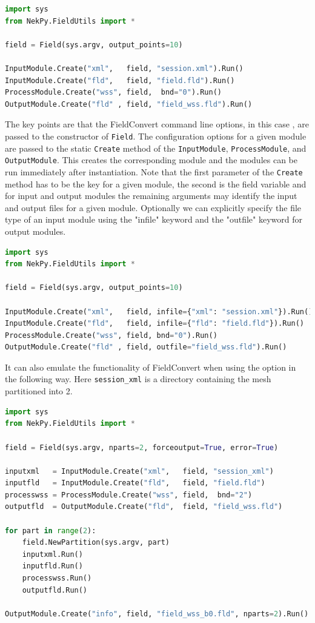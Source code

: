 \begin{lstlisting}[style=C++Style, language=Python]
import sys
from NekPy.FieldUtils import *

field = Field(sys.argv, output_points=10)

InputModule.Create("xml",   field, "session.xml").Run()
InputModule.Create("fld",   field, "field.fld").Run()
ProcessModule.Create("wss", field,  bnd="0").Run()
OutputModule.Create("fld" , field, "field_wss.fld").Run()
\end{lstlisting}

The key points are that the FieldConvert command line options, in this
case , are passed to the constructor of \verb+Field+.
The configuration options for a given module are passed to the static
\verb+Create+ method of the \verb+InputModule+, \verb+ProcessModule+, and
\verb+OutputModule+. This creates the corresponding module and the
modules can be run immediately after instantiation. Note that the first
parameter of the \verb+Create+ method has to be the key for a given module,
the second is the field variable and for input and output modules the remaining
arguments may identify the input and output files for a given module.
Optionally we can explicitly specify the file type of an input module
using the "infile" keyword and the "outfile" keyword for output modules.


\begin{lstlisting}[style=C++Style, language=Python]
import sys
from NekPy.FieldUtils import *

field = Field(sys.argv, output_points=10)

InputModule.Create("xml",   field, infile={"xml": "session.xml"}).Run()
InputModule.Create("fld",   field, infile={"fld": "field.fld"}).Run()
ProcessModule.Create("wss", field, bnd="0").Run()
OutputModule.Create("fld" , field, outfile="field_wss.fld").Run()
\end{lstlisting}

It can also emulate the functionality of FieldConvert when using the
 option in the following way. Here \verb+session_xml+ is a
directory containing the mesh partitioned into 2.

\begin{lstlisting}[style=C++Style, language=Python]
import sys
from NekPy.FieldUtils import *

field = Field(sys.argv, nparts=2, forceoutput=True, error=True)

inputxml   = InputModule.Create("xml",   field, "session_xml")
inputfld   = InputModule.Create("fld",   field, "field.fld")
processwss = ProcessModule.Create("wss", field,  bnd="2")
outputfld  = OutputModule.Create("fld",  field, "field_wss.fld")

for part in range(2):
	field.NewPartition(sys.argv, part)
	inputxml.Run()
	inputfld.Run()
	processwss.Run()
	outputfld.Run()

OutputModule.Create("info", field, "field_wss_b0.fld", nparts=2).Run()
\end{lstlisting}

